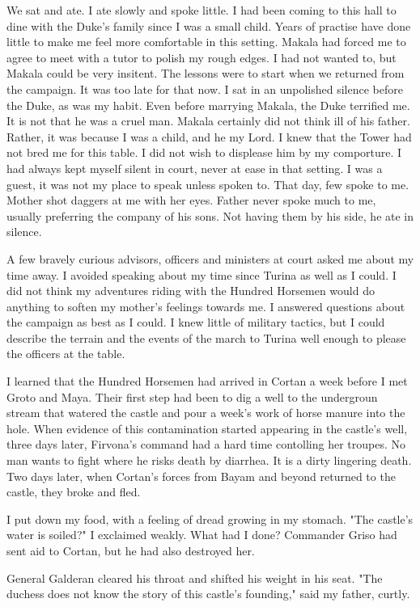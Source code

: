 \documentclass{article}
\begin{document}
We sat and ate. I ate slowly and spoke little. I had been coming to this hall to dine with the Duke's family since I was a small child. Years of practise have done little to make me feel more comfortable in this setting. Makala had forced me to agree to meet with a tutor to polish my rough edges. I had not wanted to, but Makala could be very insitent. The lessons were to start when we returned from the campaign. It was too late for that now. I sat in an unpolished silence before the Duke, as was my habit. Even before marrying Makala, the Duke terrified me. It is not that he was a cruel man. Makala certainly did not think ill of his father. Rather, it was because I was a child, and he my Lord. I knew that the Tower had not bred me for this table. I did not wish to displease him by my comporture. I had always kept myself silent in court, never at ease in that setting. I was a guest, it was not my place to speak unless spoken to. That day, few spoke to me. Mother shot daggers at me with her eyes. Father never spoke much to me, usually preferring the company of his sons. Not having them by his side, he ate in silence. 

A few bravely curious advisors, officers and ministers at court asked me about my time away. I avoided speaking about my time since Turina as well as I could. I did not think my adventures riding with the Hundred Horsemen would do anything to soften my mother's feelings towards me. I answered questions about the campaign as best as I could. I knew little of military tactics, but I could describe the terrain and the events of the march to Turina well enough to please the officers at the table. 

I learned that the Hundred Horsemen had arrived in Cortan a week before I met Groto and Maya. Their first step had been to dig a well to the undergroun stream that watered the castle and pour a week's work of horse manure into the hole. When evidence of this contamination started appearing in the castle's well, three days later, Firvona's command had a hard time contolling her troupes. No man wants to fight where he risks death by diarrhea. It is a dirty lingering death. Two days later, when Cortan's forces from Bayam and beyond returned to the castle, they broke and fled. 

I put down my food, with a feeling of dread growing in my stomach. "The castle's water is soiled?" I exclaimed weakly. What had I done? Commander Griso had sent aid to Cortan, but he had also destroyed her. 

General Galderan cleared his throat and shifted his weight in his seat. "The duchess does not know the story of this castle's founding," said my father, curtly.
\end{document}
